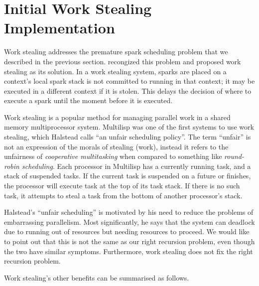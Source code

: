 
\section{Initial Work Stealing Implementation}
\label{sec:rts_work_stealing}

Work stealing addresses the premature spark scheduling problem that we
described in the previous section.
\citet{wang:2006:hons} recongized this problem and proposed work stealing as
its solution.
In a work stealing system,
sparks are placed on a context's local spark stack
is not committed to running in that context;
it may be executed in a different context if it is stolen.
This delays the decision of where to execute a spark until the moment
before it is executed.

Work stealing is a popular method for managing parallel work in a shared
memory multiprocessor system.
Multilisp \citep{halstead:1985:multilisp} was one of the first systems to
use work stealing,
which Halstead calls ``an unfair scheduling policy''.
The term ``unfair'' is not an expression of the morals of stealing (work),
instead it refers to the unfairness of \emph{cooperative multitasking} when
compared to something like \emph{round-robin scheduling}.
Each processor in Multilisp has a currently running task,
and a stack of suspended tasks.
If the current task is suspended on a future or finishes,
the processor will execute task at the top of its task stack.
If there is no such task,
it attempts to steal a task from the bottom of another processor's stack.

Halstead's ``unfair scheduling'' is motivated by his need to reduce the
problems of embarrassing parallelism.
Most significantly,
he says that the system can deadlock due to running out of resources but
needing resources to proceed.
We would like to point out that 
this is not the same as our right recursion problem,
even though the two have similar symptoms.
Furthermore,
work stealing does not fix the right recursion problem.

Work stealing's other benefits can be summarised as follows.


